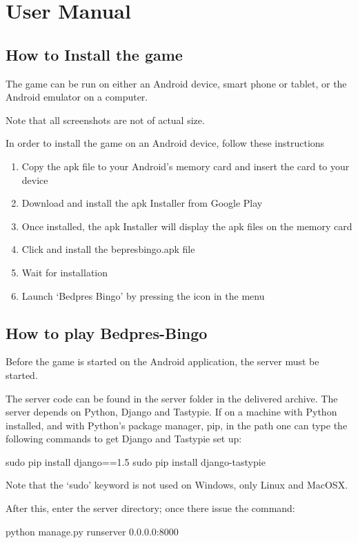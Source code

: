\section{User Manual}
\label{usermanual}

\subsection{How to Install the game}
The game can be run on either an Android device, smart phone or tablet, or
the Android emulator on a computer.

Note that all screenshots are not of actual size.

In order to install the game on an Android device, follow these instructions
\begin{enumerate}
\item Copy the apk file to your Android's memory card and insert the card to
your device
\item Download and install the apk Installer from Google Play\cite{website:apk}
\item Once installed, the apk Installer will display the apk files on the
memory card
\item Click and install the bepresbingo.apk file
\item Wait for installation 
\item Launch `Bedpres Bingo' by pressing the icon in the menu
\end{enumerate}

\subsection{How to play Bedpres-Bingo}

Before the game is started on the Android application, the server must be started.

The server code can be found in the server folder in the delivered archive. The
server depends on Python, Django and Tastypie. If on a machine with Python installed,
and with Python's package manager, pip, in the path one can type the following commands
to get Django and Tastypie set up:

sudo pip install django==1.5
sudo pip install django-tastypie

Note that the `sudo' keyword is not used on Windows, only Linux and MacOSX.

After this, enter the server directory; once there issue the command:

python manage.py runserver 0.0.0.0:8000

